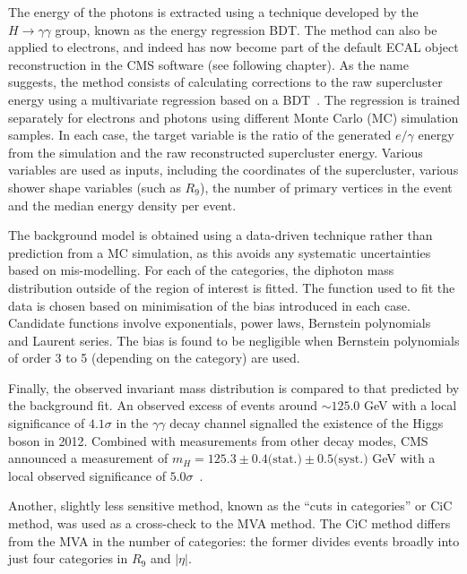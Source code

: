 \documentclass[10pt]{article}
\begin{document}
The energy of the photons is extracted using a technique developed by the $H \rightarrow \gamma \gamma$ group, known as the energy regression BDT. The method can also be applied to electrons, and indeed has now become part of the default ECAL object reconstruction in the CMS software (see following chapter). As the name suggests, the method consists of calculating corrections to the raw supercluster energy using a multivariate regression based on a BDT~\cite{shervin}. The regression is trained separately for electrons and photons using different Monte Carlo (MC) simulation samples. In each case, the target variable is the ratio of the generated $e/\gamma$ energy from the simulation and the raw reconstructed supercluster energy. Various variables are used as inputs, including the coordinates of the supercluster, various shower shape variables (such as $R_9$), the number of primary vertices in the event and the median energy density per event. 

The background model is obtained using a data-driven technique rather than prediction from a MC simulation, as this avoids any systematic uncertainties based on mis-modelling. For each of the categories, the diphoton mass distribution outside of the region of interest is fitted. The function used to fit the data is chosen based on minimisation of the bias introduced in each case. Candidate functions involve exponentials, power laws, Bernstein polynomials~\cite{bernstein} and Laurent series. The bias is found to be negligible when Bernstein polynomials of order 3 to 5 (depending on the category) are used.

Finally, the observed invariant mass distribution is compared to that predicted by the background fit. An observed excess of events around $\sim125.0$ GeV with a local significance of $4.1 \sigma$ in the $\gamma \gamma$ decay channel signalled the existence of the Higgs boson in 2012. Combined with measurements from other decay modes, CMS announced a measurement of $m_H=125.3 \pm 0.4 \text{(stat.)} \pm 0.5 \text{(syst.)}$ GeV with a local observed significance of $5.0 \sigma$~\cite{HDisc}.

Another, slightly less sensitive method, known as the ``cuts in categories'' or CiC method, was used as a cross-check to the MVA method. The CiC method differs from the MVA in the number of categories: the former divides events broadly into just four categories in $R_9$ and $|\eta|$.
\end{document}
